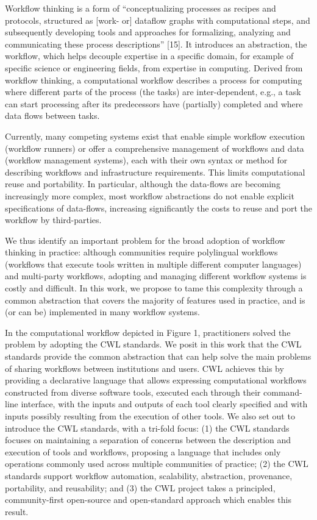 \documentclass[
]{article}
\begin{document}
Workflow thinking is a form of ``conceptualizing processes as recipes
and protocols, structured as {[}work- or{]} dataflow graphs with
computational steps, and subsequently developing tools and approaches
for formalizing, analyzing and communicating these process
descriptions'' {[}15{]}. It introduces an abstraction, the workflow,
which helps decouple expertise in a specific domain, for example of
specific science or engineering fields, from expertise in computing.
Derived from workflow thinking, a computational workflow describes a
process for computing where different parts of the process (the tasks)
are inter-dependent, e.g., a task can start processing after its
predecessors have (partially) completed and where data flows between
tasks.

Currently, many competing systems exist that enable simple workflow
execution (workflow runners) or offer a comprehensive management of
workflows and data (workflow management systems), each with their own
syntax or method for describing workflows and infrastructure
requirements. This limits computational reuse and portability. In
particular, although the data-flows are becoming increasingly more
complex, most workflow abstractions do not enable explicit
specifications of data-flows, increasing significantly the costs to
reuse and port the workflow by third-parties.

We thus identify an important problem for the broad adoption of workflow
thinking in practice: although communities require polylingual workflows
(workflows that execute tools written in multiple different computer
languages) and multi-party workflows, adopting and managing different
workflow systems is costly and difficult. In this work, we propose to
tame this complexity through a common abstraction that covers the
majority of features used in practice, and is (or can be) implemented in
many workflow systems.

In the computational workflow depicted in Figure 1, practitioners solved
the problem by adopting the CWL standards. We posit in this work that
the CWL standards provide the common abstraction that can help solve the
main problems of sharing workflows between institutions and users. CWL
achieves this by providing a declarative language that allows expressing
computational workflows constructed from diverse software tools,
executed each through their command-line interface, with the inputs and
outputs of each tool clearly specified and with inputs possibly
resulting from the execution of other tools. We also set out to
introduce the CWL standards, with a tri-fold focus: (1) the CWL
standards focuses on maintaining a separation of concerns between the
description and execution of tools and workflows, proposing a language
that includes only operations commonly used across multiple communities
of practice; (2) the CWL standards support workflow automation,
scalability, abstraction, provenance, portability, and reusability; and
(3) the CWL project takes a principled, community-first open-source and
open-standard approach which enables this result.
\end{document}
